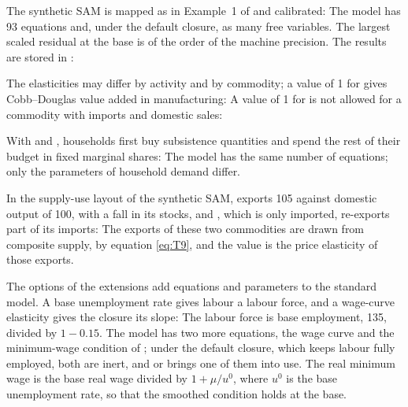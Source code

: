 
The synthetic SAM is mapped as in Example~1 of  and calibrated:
The model has 93 equations and, under the default closure, as many free
variables. The largest scaled residual at the base is of the order of the
machine precision. The results are stored in :


The elasticities may differ by activity and by commodity; a value of 1 for
 gives Cobb--Douglas value added in manufacturing:
A value of 1 for  is not allowed for a commodity with imports
and domestic sales:


With  and , households first buy subsistence
quantities and spend the rest of their budget in fixed marginal shares:
The model has the same number of equations; only the parameters of household
demand differ.


In the supply-use layout of the synthetic SAM,  exports 105
against domestic output of 100, with a fall in its stocks, and ,
which is only imported, re-exports part of its imports:
The exports of these two commodities are drawn from composite supply, by
equation \eqref{eq:T9}, and the  value is the price elasticity of those
exports.


The options of the extensions add equations and parameters to the standard
model. A base unemployment rate gives labour a labour force, and a wage-curve
elasticity gives the closure  its slope:
The labour force is base employment, 135, divided by $1 - 0.15$. The model has
two more equations, the wage curve and the minimum-wage condition of
; under the default closure, which keeps labour fully employed, both
are inert, and  or
 brings one of them into use. The real minimum wage is the
base real wage divided by $1 + \mu/u^0$, where $u^0$ is the base unemployment
rate, so that the smoothed condition holds at the base.

